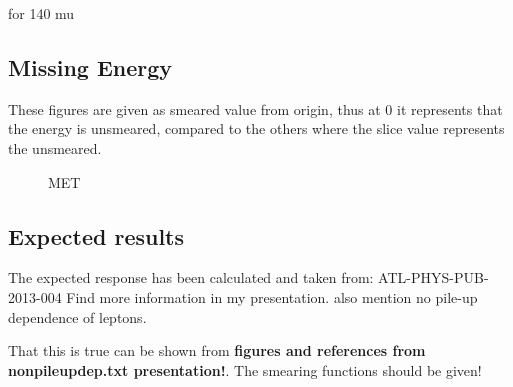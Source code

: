 for 140 mu

\newpage
\subsection{Missing Energy}
These figures are given as smeared value from origin, thus at 0 it represents that the energy is unsmeared, compared to the others where the slice value represents the unsmeared. 
 \begin{figure}[H] %
    \hfill
        \hfill
   \caption{MET}
    \label{fig:MET}
  \end{figure}

\subsection{Expected results}\label{cha:vali:sec:results:subsec:expr}

The expected response has been calculated and taken from: ATL-PHYS-PUB-2013-004
Find more information in my presentation. also mention no pile-up dependence of leptons.


That this is true can be shown from \textbf{figures and references from nonpileupdep.txt presentation!}. The smearing functions should be given! 

